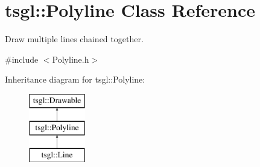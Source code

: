 \hypertarget{classtsgl_1_1_polyline}{}\section{tsgl\+:\+:Polyline Class Reference}
\label{classtsgl_1_1_polyline}


Draw multiple lines chained together.  




{\ttfamily \#include $<$Polyline.\+h$>$}

Inheritance diagram for tsgl\+:\+:Polyline\+:\begin{figure}[H]
\begin{center}
\leavevmode
\includegraphics[height=3.000000cm]{classtsgl_1_1_polyline}
\end{center}
\end{figure}
